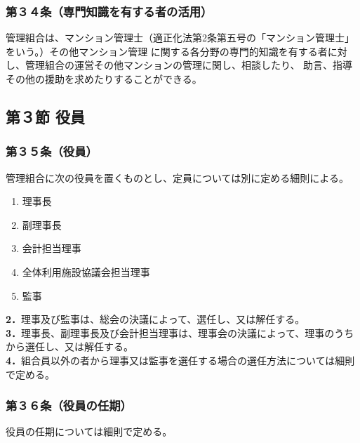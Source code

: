 \documentclass[
  luatex,
  paper=a4paper,
  fontsize=11pt,
  jafontsize=10pt,
  jlreq_notes,
]{jlreq}
\begin{document}
  \subsubsection*{第３４条（専門知識を有する者の活用）}
  管理組合は、マンション管理士（適正化法第2条第五号の「マンション管理士」をいう。）その他マンション管理
  に関する各分野の専門的知識を有する者に対し、管理組合の運営その他マンションの管理に関し、相談したり、
  助言、指導その他の援助を求めたりすることができる。
  
  \begin{center}
  \subsection*{第３節 役員}
  \end{center}
  \subsubsection*{第３５条（役員）}
  管理組合に次の役員を置くものとし、定員については別に定める細則による。
  \begin{enumerate}
  \item 理事長
  \item 副理事長
  \item 会計担当理事
  \item 全体利用施設協議会担当理事
  \item 監事
  \end{enumerate}
  \textbf{2．}理事及び監事は、総会の決議によって、選任し、又は解任する。\\
  \textbf{3．}理事長、副理事長及び会計担当理事は、理事会の決議によって、理事のうちから選任し、又は解任する。\\
  \textbf{4．}組合員以外の者から理事又は監事を選任する場合の選任方法については細則で定める。\\
  \subsubsection*{第３６条（役員の任期）}
  役員の任期については細則で定める。
\end{document}
